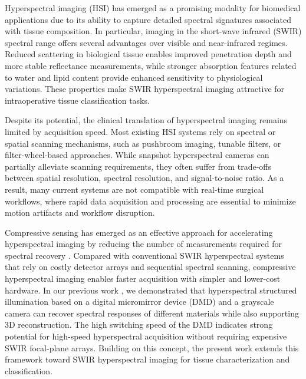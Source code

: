 \documentclass[conference]{IEEEtran}
\begin{document}
Hyperspectral imaging (HSI) has emerged as a promising modality for biomedical applications \cite{Bhargava2024HSIReview,Golovynskyi2023Lipids} due to its ability to capture detailed spectral signatures associated with tissue composition. In particular, imaging in the short-wave infrared (SWIR) spectral range offers several advantages over visible and near-infrared regimes. Reduced scattering in biological tissue enables improved penetration depth and more stable reflectance measurements, while stronger absorption features related to water and lipid content provide enhanced sensitivity to physiological variations\cite{Wilson2015SWIRReview, Roblyer2025SWIRReview, Wilson2025SWIRDecade}. These properties make SWIR hyperspectral imaging attractive for intraoperative tissue classification tasks.

Despite its potential, the clinical translation of hyperspectral imaging remains limited by acquisition speed. Most existing HSI systems rely on spectral or spatial scanning mechanisms\cite{Gao2010IMS,Antony2024HSIReview,Stegemann2025HSI}, such as pushbroom imaging, tunable filters, or filter-wheel-based approaches. While snapshot hyperspectral cameras can partially alleviate scanning requirements, they often suffer from trade-offs between spatial resolution, spectral resolution, and signal-to-noise ratio. As a result, many current systems are not compatible with real-time surgical workflows, where rapid data acquisition and processing are essential to minimize motion artifacts and workflow disruption.

Compressive sensing has emerged as an effective approach for accelerating hyperspectral imaging by reducing the number of measurements required for spectral recovery \cite{Sun2009CSHSI}. Compared with conventional SWIR hyperspectral systems that rely on costly detector arrays and sequential spectral scanning, compressive hyperspectral imaging enables faster acquisition with simpler and lower-cost hardware. In our previous work \cite{Xu2020HSP}, we demonstrated that hyperspectral structured illumination based on a digital micromirror device (DMD) and a grayscale camera can recover spectral responses of different materials while also supporting 3D reconstruction. The high switching speed of the DMD indicates strong potential for high-speed hyperspectral acquisition without requiring expensive SWIR focal-plane arrays. Building on this concept, the present work extends this framework toward SWIR hyperspectral imaging for tissue characterization and classification.
\end{document}
